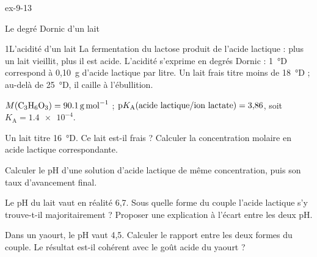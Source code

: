 \begin{blocLivre}{ex-9-13}
\begin{exercice}[3]{Le degré Dornic d'un lait}
\begin{docu}{1}{L'acidité d'un lait}
La fermentation du lactose produit de l'acide lactique  : plus un lait vieillit, plus il est acide.
L'acidité s'exprime en degrés Dornic : 1~°D correspond à 0,10~g d'acide lactique par litre. Un lait frais titre moins
de 18~°D ; au-delà de 25~°D, il caille à l'ébullition.
\end{docu}
\begin{donnees}
$M(\ce{C3H6O3})=\qty{90,1}{g.mol^{-1}}$ ; $\mathrm{p}K_{\mathrm{A}}(\text{acide lactique/ion lactate})=3{,}86$, soit
$K_\mathrm{A}=\num{1.4e-4}$.
\end{donnees}
\begin{questions}
\item Un lait titre 16~°D. Ce lait est-il frais ? Calculer la concentration molaire en acide lactique correspondante.
\item {}Calculer le pH d'une solution d'acide lactique de même concentration, puis son
taux d'avancement final.
\item Le pH du lait vaut en réalité 6,7. Sous quelle forme du couple l'acide lactique s'y trouve-t-il
majoritairement ? Proposer une explication à l'écart entre les deux pH.
\item \initiative Dans un yaourt, le pH vaut 4,5. Calculer le rapport entre les deux formes du couple. Le résultat
est-il cohérent avec le goût acide du yaourt ?
\end{questions}
\end{exercice}
\end{blocLivre}
